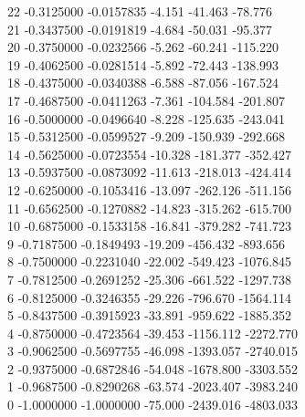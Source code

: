     22  -0.3125000  -0.0157835          -4.151     -41.463     -78.776\\
    21  -0.3437500  -0.0191819          -4.684     -50.031     -95.377\\
    20  -0.3750000  -0.0232566          -5.262     -60.241    -115.220\\
    19  -0.4062500  -0.0281514          -5.892     -72.443    -138.993\\
    18  -0.4375000  -0.0340388          -6.588     -87.056    -167.524\\
    17  -0.4687500  -0.0411263          -7.361    -104.584    -201.807\\
    16  -0.5000000  -0.0496640          -8.228    -125.635    -243.041\\
    15  -0.5312500  -0.0599527          -9.209    -150.939    -292.668\\
    14  -0.5625000  -0.0723554         -10.328    -181.377    -352.427\\
    13  -0.5937500  -0.0873092         -11.613    -218.013    -424.414\\
    12  -0.6250000  -0.1053416         -13.097    -262.126    -511.156\\
    11  -0.6562500  -0.1270882         -14.823    -315.262    -615.700\\
    10  -0.6875000  -0.1533158         -16.841    -379.282    -741.723\\
     9  -0.7187500  -0.1849493         -19.209    -456.432    -893.656\\
     8  -0.7500000  -0.2231040         -22.002    -549.423   -1076.845\\
     7  -0.7812500  -0.2691252         -25.306    -661.522   -1297.738\\
     6  -0.8125000  -0.3246355         -29.226    -796.670   -1564.114\\
     5  -0.8437500  -0.3915923         -33.891    -959.622   -1885.352\\
     4  -0.8750000  -0.4723564         -39.453   -1156.112   -2272.770\\
     3  -0.9062500  -0.5697755         -46.098   -1393.057   -2740.015\\
     2  -0.9375000  -0.6872846         -54.048   -1678.800   -3303.552\\
     1  -0.9687500  -0.8290268         -63.574   -2023.407   -3983.240\\
     0  -1.0000000  -1.0000000         -75.000   -2439.016   -4803.033\\
\\
